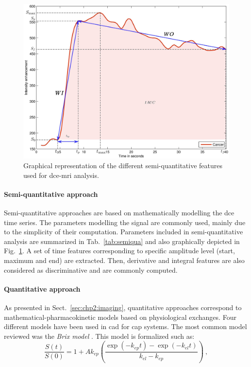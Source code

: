 \begin{figure}
	\centering
	\includegraphics[width=.8\linewidth]{3_review/figures/feature-detection/dce/dce_cancer_parameters.eps}
	\caption[Semi-quantitative features used for \acs*{dce}-\acs*{mri}.]{Graphical representation of the different semi-quantitative features used for \acs*{dce}-\acs*{mri} analysis.}
	\label{fig:dceparam}
\end{figure}

\paragraph{Semi-quantitative approach}
Semi-quantitative approaches are based on mathematically modelling the \ac{dce} time series.
The parameters modelling the signal are commonly used, mainly due to the simplicity of their computation.
Parameters included in semi-quantitative analysis are summarized in Tab.~\ref{tab:semiqua} and also graphically depicted in Fig.~\ref{fig:dceparam}.
A set of time features corresponding to specific amplitude level (start, maximum and end) are extracted.
Then, derivative and integral features are also considered as discriminative and are commonly computed.


\paragraph{Quantitative approach}
As presented in Sect.~\ref{sec:chp2:imaging}, quantitative approaches correspond to mathematical-pharmacokinetic models based on physiological exchanges.
Four different models have been used in \ac{cad} for \ac{cap} systems.
The most common model reviewed was the \textit{Brix model} \cite{Artan2009,Artan2010,Sung2011,Liu2009,Ozer2009,Ozer2010}.
This model is formalized such as:
\begin{equation}
	\frac{S(t)}{S(0)} = 1 + A k_{ep} \left( \frac{\exp( -k_{ep} t ) - \exp( -k_{el} t )}{k_{el} - k_{ep}} \right) \ ,
	\label{eq:brixmod}
\end{equation}

